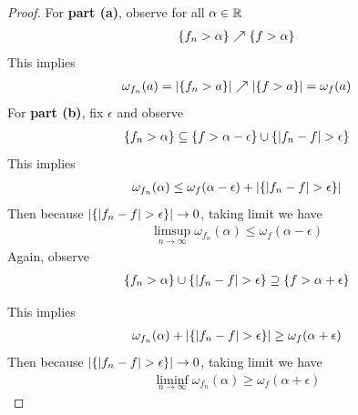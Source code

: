 \documentclass{report}
\begin{document}
\begin{proof}
For \textbf{part (a)}, observe for all $\alpha \in\mathbb{R}$
\begin{align*}
\{ f_n>\alpha  \}\nearrow \{ f>\alpha  \}
\end{align*}
This implies 
\begin{align*}
\omega_{f_n}(a)=\left|\{ f_n>a \}\right|\nearrow \left|\{ f>a \}\right|=\omega_f(a)
\end{align*}
For \textbf{part (b)}, fix $\epsilon $ and  observe 
\begin{align*}
\set{f_n > \alpha }\subseteq \set{f > \alpha  -\epsilon } \cup  \set{ \abso{f_n -f}> \epsilon }
\end{align*}
This implies 
\begin{align*}
\omega_{f_n}(\alpha )\leq \omega_f(\alpha -\epsilon ) + \abso{\set{\abso{f_n-f}>\epsilon }}
\end{align*}
Then because $\abso{\set{\abso{f_n-f}> \epsilon }} \to 0$, taking limit we have 
\begin{align*}
\limsup_{n\to\infty} \omega_{f_n}(\alpha )\leq \omega_f (\alpha - \epsilon )
\end{align*}
Again, observe 
\begin{align*}
  \set{f_n > \alpha } \cup  \set{\abso{f_n-f}> \epsilon } \supseteq \set{f> \alpha + \epsilon }
\end{align*}

This implies 
\begin{align*}
\omega_{f_n}(\alpha )+\abso{\set{\abso{f_n-f}> \epsilon }} \geq \omega_f (\alpha +\epsilon  )
\end{align*}
Then because $\abso{\set{\abso{f_n-f}> \epsilon }} \to 0$, taking limit we have 
\begin{align*}
\liminf_{n\to\infty}  \omega_{f_n}(\alpha )\geq  \omega_f (\alpha + \epsilon )
\end{align*}
\end{proof}
\end{document}
